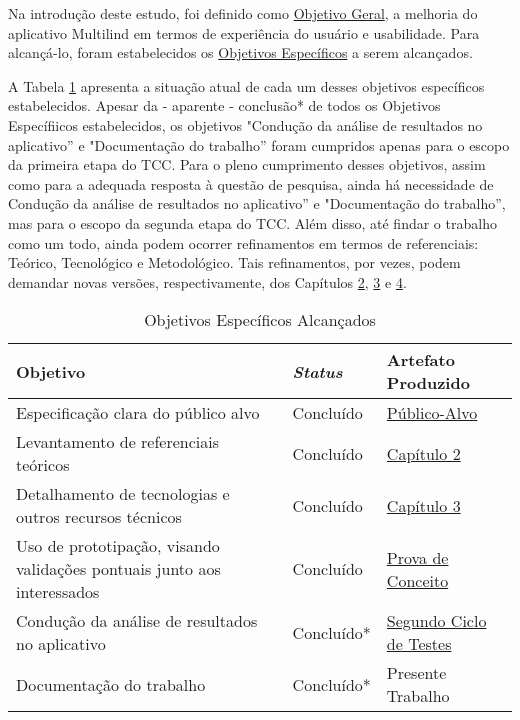 Na introdução deste estudo, foi definido como \hyperref[sec:Objetivos]{Objetivo Geral}, a melhoria do aplicativo Multilind em termos de experiência do usuário e usabilidade. 
Para alcançá-lo, foram estabelecidos os \hyperref[sec:Objetivos]{Objetivos Específicos} a serem alcançados.

A Tabela \ref{tab10} apresenta a situação atual de cada um desses objetivos específicos estabelecidos. Apesar da - aparente - conclusão* de todos os Objetivos Específiicos 
estabelecidos, os objetivos "Condução da análise de resultados no aplicativo'' e "Documentação do trabalho'' foram cumpridos apenas para o escopo da primeira etapa do TCC. 
Para o pleno cumprimento desses objetivos, assim como para a adequada resposta à questão de pesquisa, ainda há necessidade de Condução da análise de resultados no aplicativo'' 
e "Documentação do trabalho'', mas para o escopo da segunda etapa do TCC. Além disso, até findar o trabalho como um todo, ainda podem ocorrer refinamentos em termos de referenciais: 
Teórico, Tecnológico e Metodológico. Tais refinamentos, por vezes, podem demandar novas versões, respectivamente, dos Capítulos \hyperref[chap:Referencial]{2}, 
\hyperref[chap:ReferencialTech]{3} e \hyperref[chap:Metodologia]{4}.

\begin{table}[h!]
	\centering
	\caption{Objetivos Específicos Alcançados}
	\label{tab10}
	\begin{tabularx}{\textwidth}{p{8cm}|p{2cm}|p{4cm}}
	\hline
    Objetivo                                                        & \textit{Status}       & Artefato Produzido             \\ \hline
    Especificação clara do público alvo                                                     & Concluído    & \hyperref[Publico-Alvo]{Público-Alvo}              \\
    Levantamento de referenciais teóricos                                          & Concluído    & \hyperref[chap:Referencial]{Capítulo 2}                   \\
    Detalhamento de tecnologias e outros recursos técnicos                                       & Concluído    & \hyperref[chap:ReferencialTech]{Capítulo 3}                    \\
    Uso de prototipação, visando validações pontuais junto aos interessados                                      & Concluído    & \hyperref[sec:Prova de Conceito]{Prova de Conceito}                   \\
    Condução da análise de resultados no aplicativo                                          & Concluído*    & \hyperref[sec:Segundo Ciclo]{Segundo Ciclo de Testes}                    \\
    Documentação do trabalho                       & Concluído*    & Presente Trabalho         \\ \hline
	\end{tabularx}
\end{table}

